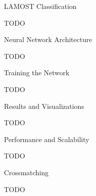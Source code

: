 \chap LAMOST Classification

TODO

\sec Neural Network Architecture

TODO

\sec Training the Network

TODO

\sec Results and Visualizations

TODO

\sec Performance and Scalability

TODO

\sec Crossmatching

TODO
